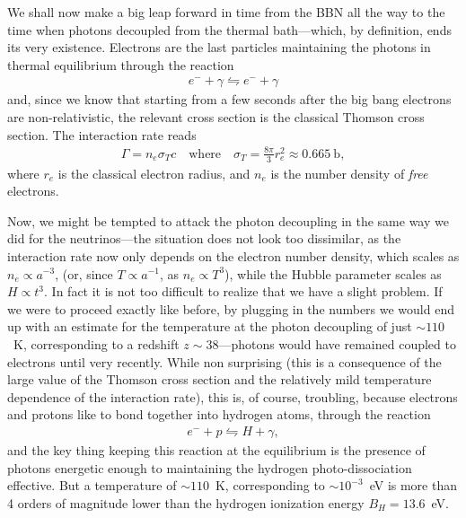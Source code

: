We shall now make a big leap forward in time from the BBN all the way to the time
when photons decoupled from the thermal bath---which, by definition, ends its very
existence. Electrons are the last particles maintaining the photons in thermal
equilibrium through the reaction
\begin{align*}
  e^- + \gamma \leftrightharpoons e^- + \gamma
\end{align*}
and, since we know that starting from a few seconds after the big bang electrons
are non-relativistic, the relevant cross section is the classical Thomson cross section.
The interaction rate reads
\begin{align*}
  \Gamma = n_e \sigma_T c
  \quad\text{where}\quad
  \sigma_T = \frac{8\pi}{3}r_e^2 \approx 0.665~\text{b},
\end{align*}
where $r_e$ is the classical electron radius, and $n_e$ is the number density of
\emph{free} electrons.

Now, we might be tempted to attack the photon decoupling in the same way we did for
the neutrinos---the situation does not look too dissimilar, as the interaction rate
now only depends on the electron number density, which scales as $n_e \propto a^{-3}$,
(or, since $T \propto a^{-1}$, as $n_e \propto T^3$), while the Hubble parameter
scales as $H \propto t^3$. In fact it is not too difficult to realize that we have a
slight problem. If we were to proceed exactly like before, by plugging in the numbers
we would end up with an estimate for the temperature at the photon decoupling of
just $\sim 110$~K, corresponding to a redshift $z \sim 38$---photons would have remained
coupled to electrons until very recently. While non surprising (this is a consequence
of the large value of the Thomson cross section and the relatively mild temperature
dependence of the interaction rate), this is, of course, troubling, because
electrons and protons like to bond together into hydrogen atoms, through the
reaction
\begin{align}\label{eq:hydrogen_formation}
  e^- + p \leftrightharpoons H + \gamma,
\end{align}
and the key thing keeping this reaction at the equilibrium is the presence of photons
energetic enough to maintaining the hydrogen photo-dissociation effective. But a
temperature of $\sim 110$~K, corresponding to $\sim 10^{-3}$~eV is more than 4
orders of magnitude lower than the hydrogen ionization energy $B_H = 13.6$~eV.

